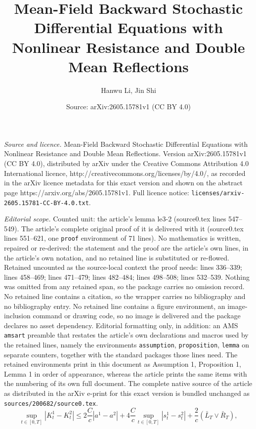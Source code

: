 \documentclass[10pt,a4paper]{amsart}
\title{Mean-Field Backward Stochastic Differential Equations with Nonlinear Resistance and Double Mean Reflections}
\author{Hanwu Li, Jin Shi}
\date{Source: arXiv:2605.15781v1 (CC BY 4.0)}
\begin{document}
\maketitle

\noindent\emph{Source and licence.} Mean-Field Backward Stochastic Differential Equations with Nonlinear Resistance and Double Mean Reflections. Version arXiv:2605.15781v1 (CC BY 4.0), distributed by arXiv under the Creative Commons Attribution 4.0 International licence, http://creativecommons.org/licenses/by/4.0/, as recorded in the arXiv licence metadata for this exact version and shown on the abstract page https://arxiv.org/abs/2605.15781v1. Full licence notice: \texttt{licenses/arxiv-2605.15781-CC-BY-4.0.txt}.\par\smallskip

\noindent\textit{Editorial scope.} Counted unit: the article's lemma le3-2 (source0.tex lines 547--549). The article's complete original proof of it is delivered with it (source0.tex lines 551--621, one \texttt{proof} environment of 71 lines). No mathematics is written, repaired or re-derived: the statement and the proof are the article's own lines, in the article's own notation, and no retained line is substituted or re-flowed.  Retained uncounted as the source-local context the proof needs: lines 336--339; lines 458--469; lines 471--479; lines 482--484; lines 498--508; lines 532--539.  Nothing was omitted from any retained span, so the package carries no omission record.  No retained line contains a citation, so the wrapper carries no bibliography and no bibliography entry.  No retained line contains a figure environment, an image-inclusion command or drawing code, so no image is delivered and the package declares no asset dependency.  Editorial formatting only, in addition: an AMS \texttt{amsart} preamble that restates the article's own declarations and macros used by the retained lines, namely the environments \texttt{assumption}, \texttt{proposition}, \texttt{lemma} on separate counters, together with the standard packages those lines need.  The retained environments print in this document as Assumption 1, Proposition 1, Lemma 1 in order of appearance, whereas the article prints the same items with the numbering of its own full document.  The complete native source of the article as distributed in the arXiv e-print for this exact version is bundled unchanged as \texttt{sources/200682/source0.tex}.
\begin{equation}\label{diffK}
\sup_{t\in[0,T]}\left|K^1_t-K^2_t\right|
\leq  2\frac{C}{c}\left|a^1-a^2\right|+4\frac{C}{c}\sup_{t\in[0,T]}\left|s^1_t-s^2_t\right|+\frac{2}{c}(\bar{L}_T\vee\bar{R}_T),
\end{equation}
\end{document}
